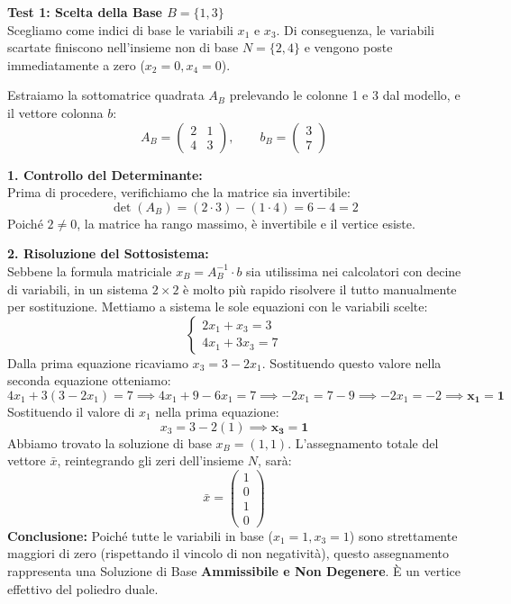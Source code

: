 \documentclass[12pt, a4paper]{article}
\begin{document}
	\vspace{0.4cm}
	\textbf{Test 1: Scelta della Base $B = \{1, 3\}$}\\
	Scegliamo come indici di base le variabili $x_1$ e $x_3$. Di conseguenza, le variabili scartate finiscono nell'insieme non di base $N = \{2, 4\}$ e vengono poste immediatamente a zero ($x_2 = 0, x_4 = 0$).
	
	Estraiamo la sottomatrice quadrata $A_B$ prelevando le colonne 1 e 3 dal modello, e il vettore colonna $b$:
	\[
	A_B = \begin{pmatrix} 2 & 1 \\ 4 & 3 \end{pmatrix}, \qquad b_B = \begin{pmatrix} 3 \\ 7 \end{pmatrix}
	\]
	
	\textbf{1. Controllo del Determinante:}\\
	Prima di procedere, verifichiamo che la matrice sia invertibile:
	\[
	\det(A_B) = (2 \cdot 3) - (1 \cdot 4) = 6 - 4 = 2
	\]
	Poiché $2 \neq 0$, la matrice ha rango massimo, è invertibile e il vertice esiste.
	
	\textbf{2. Risoluzione del Sottosistema:}\\
	Sebbene la formula matriciale $x_B = A_B^{-1} \cdot b$ sia utilissima nei calcolatori con decine di variabili, in un sistema $2 \times 2$ è molto più rapido risolvere il tutto manualmente per sostituzione. Mettiamo a sistema le sole equazioni con le variabili scelte:
	\[
	\begin{cases}
		2x_1 + x_3 = 3 \\
		4x_1 + 3x_3 = 7
	\end{cases}
	\]
	Dalla prima equazione ricaviamo $x_3 = 3 - 2x_1$. Sostituendo questo valore nella seconda equazione otteniamo:
	\[
	4x_1 + 3(3 - 2x_1) = 7 \implies 4x_1 + 9 - 6x_1 = 7 \implies -2x_1 = 7 - 9 \implies -2x_1 = -2 \implies \mathbf{x_1 = 1}
	\]
	Sostituendo il valore di $x_1$ nella prima equazione:
	\[
	x_3 = 3 - 2(1) \implies \mathbf{x_3 = 1}
	\]
	Abbiamo trovato la soluzione di base $x_B = (1, 1)$. L'assegnamento totale del vettore $\bar{x}$, reintegrando gli zeri dell'insieme $N$, sarà:
	\[
	\bar{x} = \begin{pmatrix} 1 \\ 0 \\ 1 \\ 0 \end{pmatrix}
	\]
	\textbf{Conclusione:} Poiché tutte le variabili in base ($x_1=1, x_3=1$) sono strettamente maggiori di zero (rispettando il vincolo di non negatività), questo assegnamento rappresenta una Soluzione di Base \textbf{Ammissibile e Non Degenere}. È un vertice effettivo del poliedro duale.
	
\end{document}
